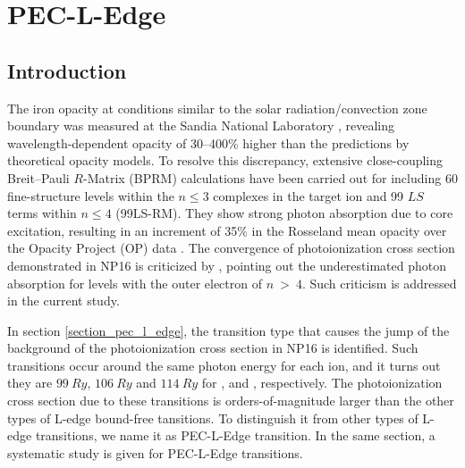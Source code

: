 \chapter{PEC-L-Edge}
\label{chap_pec_l_edge}

\section{Introduction}

The iron opacity at conditions similar to the solar radiation/convection zone boundary was measured at the Sandia National Laboratory \citep{sandia_2015}, revealing wavelength-dependent opacity of 30--400\% higher than the predictions by theoretical opacity models.
To resolve this discrepancy, extensive close-coupling Breit--Pauli $R$-Matrix (BPRM) calculations have been carried out for  including 60 fine-structure levels within the $n\leq 3$ complexes in the  target ion \citep[60CC-BPRM,][]{60cc_2011} and 99 $LS$ terms within $n\leq 4$ (99LS-RM). They show strong photon absorption due to core excitation, resulting in an increment of 35\% in the Rosseland mean opacity over the Opacity Project (OP) data \citep [][hereafter NP16]{99cc_2016}. The convergence of photoionization cross section demonstrated in NP16 is criticized by \citet{more_comment_2017}, pointing out the underestimated photon absorption for levels with the outer electron of $n~>~4$. Such criticism is addressed in the current study. 

In section \ref{section_pec_l_edge}, the transition type that causes the jump of the background of the photoionization cross section in NP16 is identified. Such transitions occur around the same photon energy for each ion, and it turns out they are $99~Ry$, $106~Ry$ and $114~Ry$ for ,  and , respectively. The photoionization cross section due to these transitions is orders-of-magnitude larger than the other types of L-edge bound-free tansitions. To distinguish it from other types of L-edge transitions, we name it as PEC-L-Edge transition. In the same section, a systematic study is given for PEC-L-Edge transitions.


